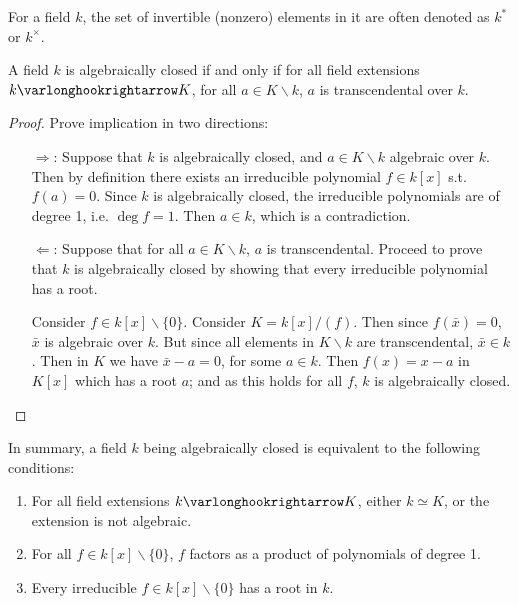 \begin{notation}
    For a field $k$, the set of invertible (nonzero) elements in it are often denoted as $k^{\ast}$ or $k^{\times}$.
\end{notation}

\begin{proposition}
    A field $k$ is algebraically closed if and only if for all field extensions $k \ext K$, for all $a \in K \smallsetminus k$, $a$ is transcendental over $k$.
\end{proposition}

\begin{proof}
    Prove implication in two directions:
    \begin{itemize}
        \item[$\Rightarrow$:] Suppose that $k$ is algebraically closed, and $a \in K \smallsetminus k$ algebraic over $k$. Then by definition there exists an irreducible polynomial $f \in k[x]$ s.t. $f(a) = 0$. Since $k$ is algebraically closed, the irreducible polynomials are of degree 1, i.e. $\deg f = 1$. Then $a \in k$, which is a contradiction.
        \item[$\Leftarrow$:] Suppose that for all $a \in K \smallsetminus k$, $a$ is transcendental. Proceed to prove that $k$ is algebraically closed by showing that every irreducible polynomial has a root. 
        
        Consider $f \in k[x] \smallsetminus \{0\}$. Consider $K = k[x]/(f)$. Then since $f(\bar{x}) = 0$, $\bar{x}$ is algebraic over $k$. But since all elements in $K \smallsetminus k$ are transcendental, $\bar{x} \in k$. Then in $K$ we have $\bar{x} - a = 0$, for some $a \in k$. Then $f(x) = x - a$ in $K[x]$ which has a root $a$; and as this holds for all $f$, $k$ is algebraically closed.
    \end{itemize}
\end{proof}

\textstart
In summary, a field $k$ being algebraically closed is equivalent to the following conditions:
\begin{enumerate}[label=\arabic*)]
    \item For all field extensions $k \ext K$, either $k \simeq K$, or the extension is not algebraic. 
    \item For all $f \in k[x] \smallsetminus \{0\}$, $f$ factors as a product of polynomials of degree 1.
    \item Every irreducible $f \in k[x] \smallsetminus \{0\}$ has a root in $k$. 
\end{enumerate}

